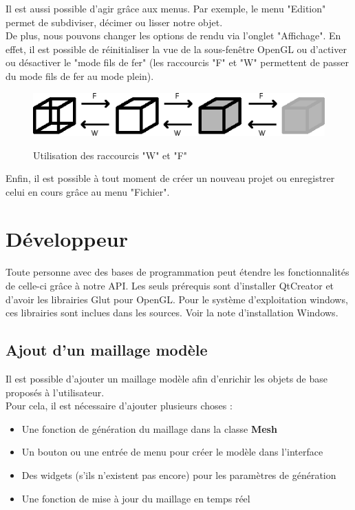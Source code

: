 \documentclass[a4paper]{memoir}
\begin{document}
			Il est aussi possible d'agir grâce aux menus. Par exemple, le menu "Edition" permet de subdiviser, décimer ou lisser notre objet.\\
			De plus, nous pouvons changer les options de rendu via l'onglet "Affichage". En effet, il est possible de réinitialiser la vue de la 
			sous-fenêtre OpenGL ou d'activer ou désactiver le "mode fils de fer" (les raccourcis "F" et "W" permettent de passer du mode fils de fer 
			au mode plein).
			\begin{figure}[H]
				\begin{center}
					\includegraphics[scale=0.8]{img/wire-fill.png}
					\label{fig:wire-fill}
					\caption{Utilisation des raccourcis "W" et "F"}
				\end{center}
			\end{figure}
			Enfin, il est possible à tout moment de créer un nouveau projet ou enregistrer celui en cours grâce au menu "Fichier".

		\section{Développeur}
			\label{man-dev}
			Toute personne avec des bases de programmation peut étendre les fonctionnalités de celle-ci grâce à notre API. Les seuls prérequis sont 
			d'installer QtCreator et d'avoir les librairies Glut pour OpenGL. Pour le système d'exploitation windows, ces librairies sont inclues dans les 
			sources. Voir la note d'installation Windows.
			
			\subsection{Ajout d'un maillage modèle}
				Il est possible d'ajouter un maillage modèle afin d'enrichir les objets de base proposés à l'utilisateur.\\
				Pour cela, il est nécessaire d'ajouter plusieurs choses :
				\begin{itemize}
					\item Une fonction de génération du maillage dans la classe \textbf{Mesh}
					\item Un bouton ou une entrée de menu pour créer le modèle dans l'interface
					\item Des widgets (s'ils n'existent pas encore) pour les paramètres de génération
					\item Une fonction de mise à jour du maillage en temps réel
				\end{itemize}
				
\end{document}
